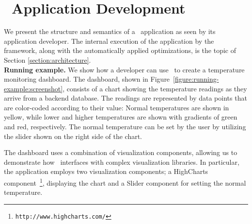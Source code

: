 \section{\projname\ Application Development}
\label{section:programming-model}

  We present the structure and semantics of a \projname\ application as seen by its application developer. The internal execution of the application by the framework, along with the automatically applied optimizations, is the topic of Section \ref{section:architecture}.  \\ 

\noindent \textbf{Running example.} We show how a developer can use \projname\ to create a temperature monitoring dashboard. The dashboard, shown in Figure~\ref{figure:running-example:screenshot}, consists of a chart showing the temperature readings as they arrive from a backend database.  The readings are represented by data points that are color-coded according to their value: Normal temperatures are shown in yellow, while lower and higher temperatures are shown with gradients of green and red, respectively. The normal temperature can be set by the user by utilizing the slider shown on the right side of the chart. %

The dashboard uses a combination of visualization components, allowing us to demonstrate how \projname\ interfaces with complex visualization libraries. In particular, the application employs two visualization components; a HighCharts component~\footnote{\texttt{http://www.highcharts.com/}}, displaying the chart and a Slider component for setting the normal temperature.  \\




